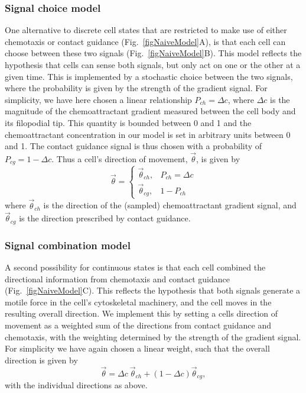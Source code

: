 \documentclass[review]{elsarticle}
\begin{document}
\subsubsection{Signal choice model}
One alternative to discrete cell states that are restricted to make use of either chemotaxis or contact guidance (Fig.~\ref{figNaiveModel}A), is that each cell can choose between these two signals (Fig.~\ref{figNaiveModel}B). This model reflects the hypothesis that cells can sense both signals, but only act on one or the other at a given time. This is implemented by a stochastic choice between the two signals, where the probability is given by the strength of the gradient signal. For simplicity, we have here chosen a linear relationship $P_{ch} = \Delta c$, where $\Delta c$ is the magnitude of the chemoattractant gradient measured between the cell body and its filopodial tip. This quantity is bounded between 0 and 1 and the chemoattractant concentration in our model is set in arbitrary units between 0 and 1. The contact guidance signal is thus chosen with a probability of $P_{cg} = 1 - \Delta c$. Thus a cell's direction of movement, $\vec{\theta}$, is given by
\begin{equation}
     \vec{\theta} = 
         \begin{cases}
         \vec{\theta}_{ch}, & P_{ch} = \Delta c \\
        \vec{\theta}_{cg}, & 1 - P_{ch}
        \end{cases}
\end{equation}
where $\vec{\theta}_{ch}$ is the direction of the (sampled) chemoattractant gradient signal, and $\vec{\theta}_{cg}$ is the direction prescribed by contact guidance.

\subsubsection{Signal combination model}
A second possibility for continuous states is that each cell combined the directional information from chemotaxis and contact guidance (Fig.~\ref{figNaiveModel}C). This reflects the hypothesis that both signals generate a motile force in the cell's cytoskeletal machinery, and the cell moves in the resulting overall direction. We implement this by setting a cells direction of movement as a weighted sum of the directions from contact guidance and chemotaxis, with the weighting determined by the strength of the gradient signal. For simplicity we have again chosen a linear weight, such that the overall direction is given by 
\begin{equation}
	\vec{\theta} = \Delta c\ \vec{\theta}_{ch} + (1 - \Delta c)\vec{\theta}_{cg},
\end{equation}
with the individual directions as above.
\end{document}
